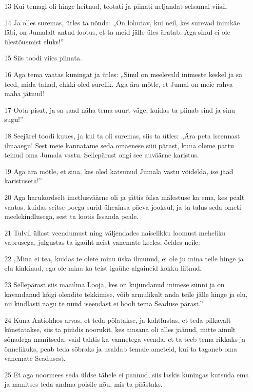 \par 13 Kui temagi oli hinge heitnud, teotati ja piinati neljandat selsamal viisil.
\par 14 Ja olles suremas, ütles ta nõnda: „On lohutav, kui neil, kes surevad inimkäe läbi, on Jumalalt antud lootus, et ta meid jälle üles äratab. Aga sinul ei ole ülestõusmist eluks!”
\par 15 Siis toodi viies piinata.
\par 16 Aga tema vaatas kuningat ja ütles: „Sinul on meelevald inimeste keskel ja sa teed, mida tahad, ehkki oled surelik. Aga ära mõtle, et Jumal on meie rahva maha jätnud!
\par 17 Oota pisut, ja sa saad näha tema suurt väge, kuidas ta piinab sind ja sinu sugu!”
\par 18 Seejärel toodi kuues, ja kui ta oli suremas, siis ta ütles: „Ära peta iseennast ilmaaegu! Sest meie kannatame seda omaenese süü pärast, kuna oleme pattu teinud oma Jumala vastu. Sellepärast ongi see auväärne karistus.
\par 19 Aga ära mõtle, et sina, kes oled katsunud Jumala vastu võidelda, ise jääd karistuseta!”
\par 20 Aga harukordselt imetlusväärne oli ja jättis õilsa mälestuse ka ema, kes pealt vaatas, kuidas seitse poega surid üheainsa päeva jooksul, ja ta talus seda ometi meelekindlusega, sest ta lootis Issanda peale.
\par 21 Tulvil üllast veendumust ning väljendades naiselikku loomust meheliku vaprusega, julgustas ta igaüht neist vanemate keeles, öeldes neile:
\par 22 „Mina ei tea, kuidas te olete minu üska ilmunud, ei ole ju mina teile hinge ja elu kinkinud, ega ole mina ka teist igaühe algaineid kokku liitnud.
\par 23 Sellepärast siis maailma Looja, kes on kujundanud inimese sünni ja on kavandanud kõigi olendite tekkimise, võib armulikult anda teile jälle hinge ja elu, nii kindlasti nagu te nüüd iseendast ei hooli tema Seaduse pärast.”
\par 24 Kuna Antiohhos arvas, et teda põlatakse, ja kahtlustas, et teda pilkavalt kõnetatakse, siis ta püüdis noorukit, kes ainsana oli alles jäänud, mitte ainult sõnadega manitseda, vaid tahtis ka vannetega veenda, et ta teeb tema rikkaks ja õnnelikuks, peab teda sõbraks ja usaldab temale ameteid, kui ta taganeb oma vanemate Seadusest.
\par 25 Et aga noormees seda üldse tähele ei pannud, siis laskis kuningas kutsuda ema ja manitses teda andma poisile nõu, mis ta päästaks.

